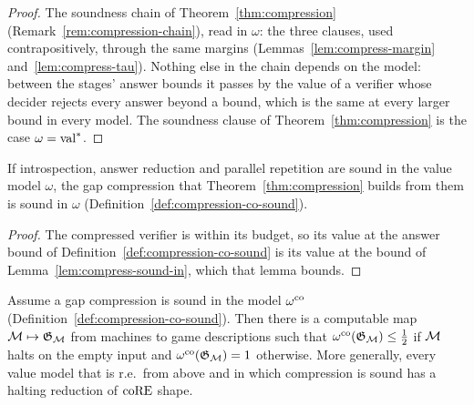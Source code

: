 \begin{proof}
\leanok
The soundness chain of Theorem~\ref{thm:compression} (Remark~\ref{rem:compression-chain}), read
in $\omega$: the three clauses, used contrapositively, through the same margins
(Lemmas~\ref{lem:compress-margin} and~\ref{lem:compress-tau}). Nothing else in the chain depends
on the model: between the stages' answer bounds it passes by the value of a verifier whose
decider rejects every answer beyond a bound, which is the same at every larger bound in every
model. The soundness clause of Theorem~\ref{thm:compression} is the case $\omega = \mathrm{val}^*$.
\end{proof}

\begin{theorem}
\label{thm:pipeline-sound-in}
\leanok
If introspection, answer reduction and parallel repetition are sound in the value model $\omega$,
the gap compression that Theorem~\ref{thm:compression} builds from them is sound in $\omega$
(Definition~\ref{def:compression-co-sound}).
\end{theorem}

\begin{proof}
\leanok
The compressed verifier is within its budget, so its value at the answer bound of
Definition~\ref{def:compression-co-sound} is its value at the bound of
Lemma~\ref{lem:compress-sound-in}, which that lemma bounds.
\end{proof}

\begin{theorem}
\label{thm:halting-co}
\leanok
Assume a gap compression is sound in the model $\omega^{\mathrm{co}}$
(Definition~\ref{def:compression-co-sound}). Then there is a computable map
$\mathcal{M} \mapsto \mathfrak{G}_{\mathcal{M}}$ from machines to game descriptions such that
$\omega^{\mathrm{co}}(\mathfrak{G}_{\mathcal{M}}) \leq \frac12$ if $\mathcal{M}$ halts on the empty input and
$\omega^{\mathrm{co}}(\mathfrak{G}_{\mathcal{M}}) = 1$ otherwise. More generally, every value model that is
r.e.\ from above and in which compression is sound has a halting reduction of $\mathrm{coRE}$ shape.
\end{theorem}

